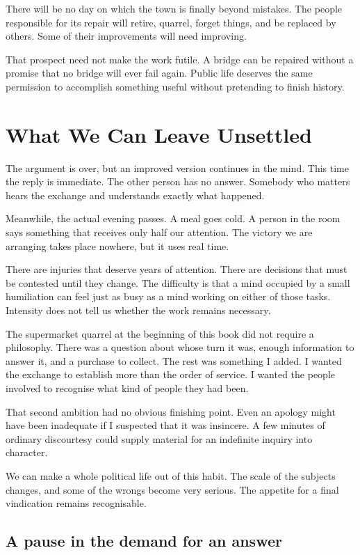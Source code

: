 \documentclass[12pt,a4paper]{book}
\begin{document}
There will be no day on which the town is finally beyond mistakes. The people responsible for its repair will retire, quarrel, forget things, and be replaced by others. Some of their improvements will need improving.

That prospect need not make the work futile. A bridge can be repaired without a promise that no bridge will ever fail again. Public life deserves the same permission to accomplish something useful without pretending to finish history.

\chapter{What We Can Leave Unsettled}

The argument is over, but an improved version continues in the mind. This time the reply is immediate. The other person has no answer. Somebody who matters hears the exchange and understands exactly what happened.

Meanwhile, the actual evening passes. A meal goes cold. A person in the room says something that receives only half our attention. The victory we are arranging takes place nowhere, but it uses real time.

There are injuries that deserve years of attention. There are decisions that must be contested until they change. The difficulty is that a mind occupied by a small humiliation can feel just as busy as a mind working on either of those tasks. Intensity does not tell us whether the work remains necessary.

The supermarket quarrel at the beginning of this book did not require a philosophy. There was a question about whose turn it was, enough information to answer it, and a purchase to collect. The rest was something I added. I wanted the exchange to establish more than the order of service. I wanted the people involved to recognise what kind of people they had been.

That second ambition had no obvious finishing point. Even an apology might have been inadequate if I suspected that it was insincere. A few minutes of ordinary discourtesy could supply material for an indefinite inquiry into character.

We can make a whole political life out of this habit. The scale of the subjects changes, and some of the wrongs become very serious. The appetite for a final vindication remains recognisable.

\section*{A pause in the demand for an answer}
\end{document}
